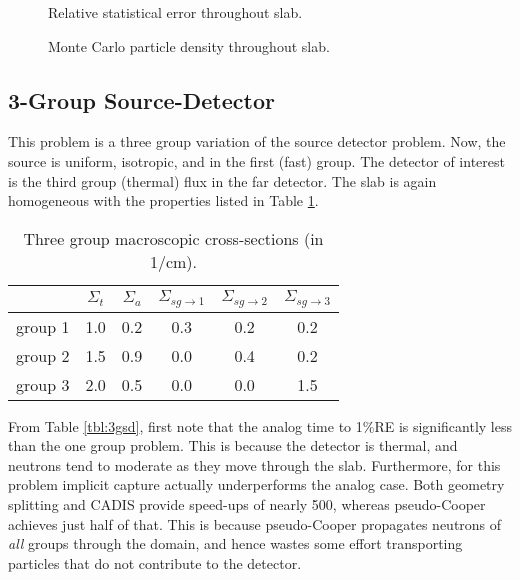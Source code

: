 \begin{figure}[h] 
   \centering
   \caption{Relative statistical error throughout slab.}
   \label{fig:1gstat}
\end{figure}

\begin{figure}[h] 
   \centering
   \caption{Monte Carlo particle density throughout slab.}
   \label{fig:1gmcps}
\end{figure}


\subsection{3-Group Source-Detector}

This problem is a three group variation of the source detector problem. Now, the
source is uniform, isotropic, and in the first (fast) group.  The detector of
interest is the third group (thermal) flux in the far detector.  The slab is
again homogeneous with the properties listed in Table \ref{tbl:3groupdata}.

\begin{table}[th]
 \caption{Three group macroscopic cross-sections (in 1/cm).}
 \begin{center} 
 {\small
 \begin{tabular*}{0.40\textwidth}{@{\extracolsep{\fill}} cccccc} 
  \toprule 
    & $\Sigma_t$ & $\Sigma_a$ & $\Sigma_{sg\to1}$ & $\Sigma_{sg\to2}$ &
$\Sigma_{sg\to3}$  \\
  \midrule 
   group 1 & 1.0 & 0.2 & 0.3 & 0.2 & 0.2 \\ 
   group 2 & 1.5 & 0.9 & 0.0 & 0.4 & 0.2 \\ 
   group 3 & 2.0 & 0.5 & 0.0 & 0.0 & 1.5 \\ 
  \bottomrule 
 \end{tabular*}
 } 
 \end{center} 
 \label{tbl:3groupdata}  
\end{table}

From Table \ref{tbl:3gsd}, first note that the analog time to 1\%RE is
significantly less than the one group problem.  This is because the detector is
thermal, and neutrons tend to moderate as they move through the slab. 
Furthermore, for this problem implicit capture actually underperforms the analog
case.  Both geometry splitting and CADIS provide speed-ups of nearly 500,
whereas pseudo-Cooper achieves just half of that.  This is because pseudo-Cooper
propagates neutrons of \emph{all} groups through the domain, and hence wastes
some effort transporting particles that do not contribute to the detector.

